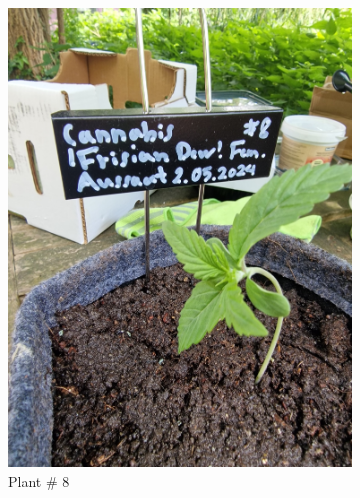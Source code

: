 \begin{figure}[htbp]
\begin{subfigure}[t]{.19\textwidth}
        \includegraphics[width=\linewidth]{plant_08_2024-05-13}
        \caption{Plant \# 8}
        \label{fig:plant_08_2024-05-13}
    \end{subfigure}
    \begin{subfigure}[t]{.19\textwidth}

\end{subfigure}
\end{figure}
